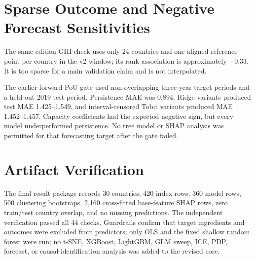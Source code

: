 \documentclass[11pt]{article}
\begin{document}
\section{Sparse Outcome and Negative Forecast Sensitivities}

The same-edition GHI check uses only 24 countries and one aligned reference point per country in the v2 window; its rank association is approximately $-0.33$. It is too sparse for a main validation claim and is not interpolated.

The earlier forward PoU gate used non-overlapping three-year target periods and a held-out 2019 test period. Persistence MAE was 0.894. Ridge variants produced test MAE 1.425--1.549, and interval-censored Tobit variants produced MAE 1.452--1.457. Capacity coefficients had the expected negative sign, but every model underperformed persistence. No tree model or SHAP analysis was permitted for that forecasting target after the gate failed.

\section{Artifact Verification}

The final result package records 30 countries, 420 index rows, 360 model rows, 500 clustering bootstraps, 2,160 cross-fitted base-feature SHAP rows, zero train/test country overlap, and no missing predictions. The independent verification passed all 44 checks. Guardrails confirm that target ingredients and outcomes were excluded from predictors; only OLS and the fixed shallow random forest were run; no t-SNE, XGBoost, LightGBM, GLM sweep, ICE, PDP, forecast, or causal-identification analysis was added to the revised core.
\end{document}
